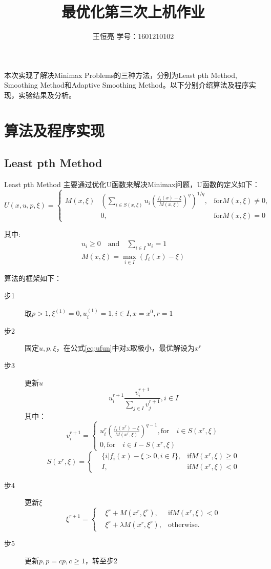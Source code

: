 \documentclass{ctexart}
\begin{document}
\title{最优化第三次上机作业}
\author{王恒亮 \quad 学号：1601210102}
\date{}
\maketitle
本次实现了解决Minimax Problems的三种方法，分别为Least pth Method\cite{Charalambous1979}, Smoothing Method\cite{Xu2001}和Adaptive Smoothing Method\cite{Polak2003}。以下分别介绍算法及程序实现，实验结果及分析。
\section{算法及程序实现}
\subsection{Least pth Method}
Least pth Method 主要通过优化U函数来解决Minimax问题，U函数的定义如下：
\begin{equation}
	\label{eq:ufun}
	U(x,u,p,\xi)=\left\{
		\begin{aligned}
			M(x,\xi)&(\sum_{i\in S(x,\xi)}{u_i(\frac{f_i(x)-\xi}{M(x,\xi)})^q})^{1/q}, &\text{for} M(x,\xi) \neq 0,\\
				       &0, &\text{for} M(x,\xi) = 0
		\end{aligned}\right.
\end{equation}

其中:
\begin{align}
	u_i \geq 0\quad \text{and} \quad\sum_{i\in I}{u_i} = 1\\
	M(x, \xi) = \max_{i\in I}{(f_i(x) - \xi)}
\end{align}

算法的框架如下：
\begin{description}
	\item[步1] 取$p>1, \xi^{(1)} =0,u_i^{(1)}=1,i\in I,x=x^0,r=1$
	\item[步2] 固定$u,p,\xi$，在公式\ref{eq:ufun}中对x取极小，最优解设为$x^r$
	\item[步3] 更新$u$
	\[u^{r+1}_i\frac{v_i^{r+1}}{\sum_{j\in I}{v_j^{r+1}}}, i\in I\]
	其中：
	\[v_{i}^{r+1}=\left\{
		\begin{aligned}
			u_i^r(\frac{f_i(x^r)-\xi}{M(x^r,\xi)})^{q-1}, \text{for}\quad i \in S(x^r,\xi)\\
			0, \text{for}\quad i\in I - S(x^r, \xi)
		\end{aligned}\right.\]
	\[S(x^r, \xi)=\left\{
		\begin{aligned}
			&\{i|f_i(x)-\xi>0,i\in I\}, &\text{if} M(x^r,\xi) \geq 0\\
			&I, &\text{if} M(x^r,\xi) <0
		\end{aligned}\right.\]
	\item[步4] 更新$\xi$
	\[\xi^{r+1} = \left\{
		\begin{aligned}
			&\xi^r + M(x^r, \xi^r) , &\text{if} M(x^r, \xi) < 0\\
			&\xi^r + \lambda M(x^r, \xi^r), &\text{otherwise.}
		\end{aligned}\right.\]
	\item[步5] 更新$p, p = cp, c\geq 1$，转至步2
\end{description}
\end{document}
